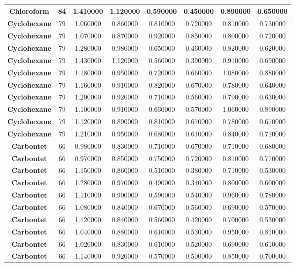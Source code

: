 \documentclass{amsart}
\begin{document}
\begin{center}
\begin{tabular}{c|c|c|c|c|c|c|c}
\textbf{Chloroform}& 84&1.410000&1.120000&0.590000&0.450000&0.890000&0.650000 \\ \hline 
\textbf{Cyclohexane}& 79&1.060000&0.860000&0.810000&0.720000&0.810000&0.730000 \\ \hline 
\textbf{Cyclohexane}& 79&1.070000&0.870000&0.920000&0.850000&0.800000&0.720000 \\ \hline 
\textbf{Cyclohexane}& 79&1.280000&0.980000&0.650000&0.460000&0.820000&0.620000 \\ \hline 
\textbf{Cyclohexane}& 79&1.430000&1.120000&0.560000&0.390000&0.910000&0.690000 \\ \hline 
\textbf{Cyclohexane}& 79&1.180000&0.950000&0.720000&0.660000&1.080000&0.880000 \\ \hline 
\textbf{Cyclohexane}& 79&1.160000&0.910000&0.820000&0.670000&0.780000&0.640000 \\ \hline 
\textbf{Cyclohexane}& 79&1.200000&0.920000&0.710000&0.560000&0.790000&0.630000 \\ \hline 
\textbf{Cyclohexane}& 79&1.100000&0.910000&0.630000&0.570000&1.060000&0.890000 \\ \hline 
\textbf{Cyclohexane}& 79&1.120000&0.890000&0.810000&0.670000&0.780000&0.670000 \\ \hline 
\textbf{Cyclohexane}& 79&1.210000&0.950000&0.680000&0.610000&0.840000&0.710000 \\ \hline 
\textbf{Carbontet}& 66&0.980000&0.830000&0.710000&0.670000&0.710000&0.680000 \\ \hline 
\textbf{Carbontet}& 66&0.970000&0.850000&0.750000&0.720000&0.810000&0.770000 \\ \hline 
\textbf{Carbontet}& 66&1.150000&0.860000&0.510000&0.380000&0.710000&0.530000 \\ \hline 
\textbf{Carbontet}& 66&1.280000&0.970000&0.490000&0.340000&0.800000&0.600000 \\ \hline 
\textbf{Carbontet}& 66&1.110000&0.900000&0.590000&0.540000&0.960000&0.780000 \\ \hline 
\textbf{Carbontet}& 66&1.080000&0.840000&0.670000&0.560000&0.690000&0.570000 \\ \hline 
\textbf{Carbontet}& 66&1.120000&0.840000&0.560000&0.420000&0.700000&0.530000 \\ \hline 
\textbf{Carbontet}& 66&1.040000&0.880000&0.610000&0.530000&0.950000&0.810000 \\ \hline 
\textbf{Carbontet}& 66&1.020000&0.830000&0.610000&0.520000&0.690000&0.610000 \\ \hline 
\textbf{Carbontet}& 66&1.140000&0.920000&0.570000&0.500000&0.850000&0.700000 \\ \hline 

\end{tabular}
\end{center}
\end{document}
